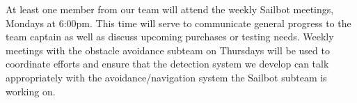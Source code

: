 At least one member from our team will attend the weekly Sailbot meetings, Mondays at 6:00pm. This time will serve to communicate general progress to the team captain as well as discuss upcoming purchases or testing needs. Weekly meetings with the obstacle avoidance subteam on Thursdays will be used to coordinate efforts and ensure that the detection system we develop can talk appropriately with the avoidance/navigation system the Sailbot subteam is working on.